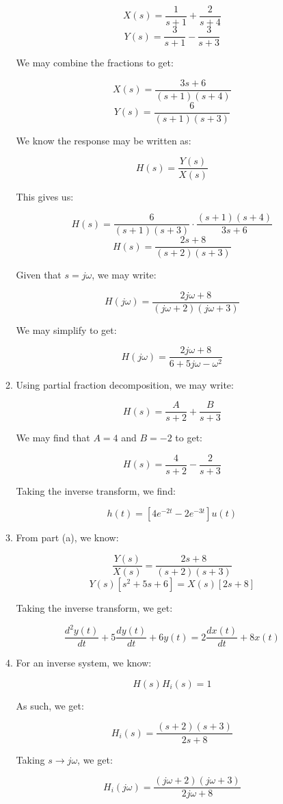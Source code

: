 \begin{enumerate}
\begin{enumerate}
        $$X(s)=\frac{1}{s+1}+\frac{2}{s+4}$$
        $$Y(s)=\frac{3}{s+1}-\frac{3}{s+3}$$

        We may combine the fractions to get:

        $$X(s)=\frac{3s+6}{(s+1)(s+4)}$$
        $$Y(s)=\frac{6}{(s+1)(s+3)}$$
        
        We know the response may be written as:

        $$H(s)=\frac{Y(s)}{X(s)}$$

        This gives us:

        $$H(s)=\frac{6}{(s+1)(s+3)}\cdot\frac{(s+1)(s+4)}{3s+6}$$
        $$H(s)=\frac{2s+8}{(s+2)(s+3)}$$

        Given that $s=j\omega$, we may write:

        $$H(j\omega)=\frac{2j\omega+8}{(j\omega+2)(j\omega+3)}$$

        We may simplify to get:

        $$\boxed{H(j\omega)=\frac{2j\omega+8}{6+5j\omega-\omega^2}}$$

      \item Using partial fraction decomposition, we may write:

        $$H(s)=\frac{A}{s+2}+\frac{B}{s+3}$$

        We may find that $A=4$ and $B=-2$ to get:

        $$H(s)=\frac{4}{s+2}-\frac{2}{s+3}$$

        Taking the inverse transform, we find:

        $$\boxed{h(t)=[4e^{-2t}-2e^{-3t}]u(t)}$$

      \item From part (a), we know:

        $$\frac{Y(s)}{X(s)}=\frac{2s+8}{(s+2)(s+3)}$$
        $$Y(s)[s^2+5s+6]=X(s)[2s+8]$$

        Taking the inverse transform, we get:

        $$\boxed{\frac{d^2y(t)}{dt}+5\frac{dy(t)}{dt}+6y(t)=2\frac{dx(t)}{dt}+8x(t)}$$

      \item For an inverse system, we know:

        $$H(s)H_i(s)=1$$

        As such, we get:

        $$H_i(s)=\frac{(s+2)(s+3)}{2s+8}$$

        Taking $s\to j\omega$, we get:

        $$\boxed{H_i(j\omega)=\frac{(j\omega+2)(j\omega+3)}{2j\omega+8}}$$


\end{enumerate}
\end{enumerate}
